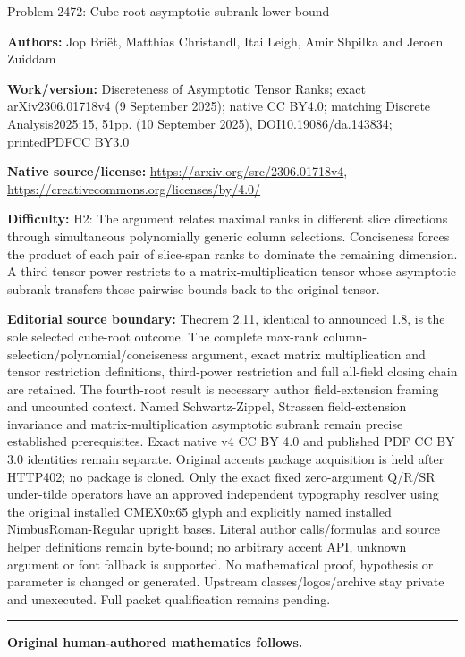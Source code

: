 \documentclass[11pt]{article}
\begin{document}
\begin{center}\Large Problem 2472: Cube-root asymptotic subrank lower bound\end{center}\noindent\textbf{Authors:} Jop Briët, Matthias Christandl, Itai Leigh, Amir Shpilka and Jeroen Zuiddam\par\noindent\textbf{Work/version:} Discreteness of Asymptotic Tensor Ranks; exact arXiv2306.01718v4 (9 September 2025); native CC BY4.0; matching Discrete Analysis2025:15, 51pp. (10 September 2025), DOI10.19086/da.143834; printedPDFCC BY3.0\par\noindent\textbf{Native source/license:} \url{https://arxiv.org/src/2306.01718v4}, \url{https://creativecommons.org/licenses/by/4.0/}\par\noindent\textbf{Difficulty:} H2: The argument relates maximal ranks in different slice directions through simultaneous polynomially generic column selections. Conciseness forces the product of each pair of slice-span ranks to dominate the remaining dimension. A third tensor power restricts to a matrix-multiplication tensor whose asymptotic subrank transfers those pairwise bounds back to the original tensor.\par\medskip\noindent\textbf{Editorial source boundary:} Theorem 2.11, identical to announced 1.8, is the sole selected cube-root outcome. The complete max-rank column-selection/polynomial/conciseness argument, exact matrix multiplication and tensor restriction definitions, third-power restriction and full all-field closing chain are retained. The fourth-root result is necessary author field-extension framing and uncounted context. Named Schwartz-Zippel, Strassen field-extension invariance and matrix-multiplication asymptotic subrank remain precise established prerequisites. Exact native v4 CC BY 4.0 and published PDF CC BY 3.0 identities remain separate. Original accents package acquisition is held after HTTP402; no package is cloned. Only the exact fixed zero-argument Q/R/SR under-tilde operators have an approved independent typography resolver using the original installed CMEX0x65 glyph and explicitly named installed NimbusRoman-Regular upright bases. Literal author calls/formulas and source helper definitions remain byte-bound; no arbitrary accent API, unknown argument or font fallback is supported. No mathematical proof, hypothesis or parameter is changed or generated. Upstream classes/logos/archive stay private and unexecuted. Full packet qualification remains pending.\par\medskip\hrule\medskip\noindent\textbf{Original human-authored mathematics follows.}\par
\setcounter{section}{1}\setcounter{subsection}{3}\setcounter{theorem}{14}
\end{document}
